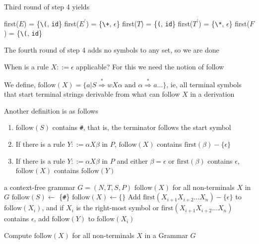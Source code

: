 \documentclass[8pt,a4paper,compress,handout]{beamer}
\newcommand{\mm}[1]{$#1$}
\newcommand{\derives}{\stackrel{*}{\Rightarrow}}
\newcommand{\expo}[2]{$#1^{#2}$}
\newenvironment{spaced}
{
\smallskip
\hspace{.5cm}
\begin{minipage}[c]{\textwidth}
}
{
\end{minipage}
\smallskip
}
\begin{document}
\begin{frame}[fragile]
\pause

Third round of step 4 yields

\text{ }
\begin{spaced}
\begin{production}
first(\mm{E})  = \{\lstinline{\(}, \lstinline{id}\}
first(\expo{E}{\prime}) = \{\lstinline{\+}, \mm{\epsilon}\}
first(\mm{T})  = \{\lstinline{(}, \lstinline{id}\}
first(\expo{T}{\prime}) = \{\lstinline{\*}, \mm{\epsilon}\}
first(\mm{F})  = \{\lstinline{\(}, \lstinline{id}\}
\end{production}
\end{spaced}

\pause

The fourth round of step 4 adds no symbols to any set, so we are done

\pause
\bigskip

When is a rule $X ::= \epsilon$ applicable?  For this we need the notion of follow

\pause
\bigskip

We define, $\text{follow}(X) = \{a | S \derives wX\alpha \text{ and } \alpha \derives a \dots\}$, ie, all terminal symbols that start terminal strings derivable from what can follow $X$ in a derivation

\pause
\bigskip

Another definition is as follows
\begin{enumerate}
\item $\text{follow}(S)$ contains \lstinline{#}, that is, the terminator follows the start symbol
\item If there is a rule $Y ::= \alpha X \beta$ in $P$, $\text{follow}(X)$ contains $\text{first}(\beta) - \{\epsilon\}$
\item If there is a rule $Y ::= \alpha X \beta$ in $P$ and either $\beta = \epsilon$ or $\text{first}(\beta)$ contains $\epsilon$, $\text{follow}(X)$ contains $\text{follow}(Y)$
\end{enumerate}
\end{frame}

\begin{frame}[fragile]
\pause

\begin{algorithm}[H]
\begin{algorithmic}
\REQUIRE a context-free grammar $G = (N,T,S,P)$
\ENSURE  $\text{follow}(X)$ for all non-terminals $X$ in $G$
\STATE $\text{follow}(S) \gets$ \{\lstinline{#}\}
\STATE $\text{follow}(X) \gets \{\}$
\ENDFOR
\REPEAT
{}
\STATE Add $\text{first}(X_{i+1}X_{i+2} \dots X_n) - \{\epsilon\}$ to $\text{follow}(X_i)$, and
if $X_i$ is the right-most symbol or $\text{first}(X_{i+1}X_{i+2} \dots X_n)$ contains $\epsilon$, add $\text{follow}(Y)$ to $\text{follow}(X_i)$
\ENDFOR
\ENDFOR
{}
\end{algorithmic}
\caption{Compute $\text{follow}(X)$ for all non-terminals $X$ in a Grammar $G$}
\end{algorithm}
\end{frame}
\end{document}
